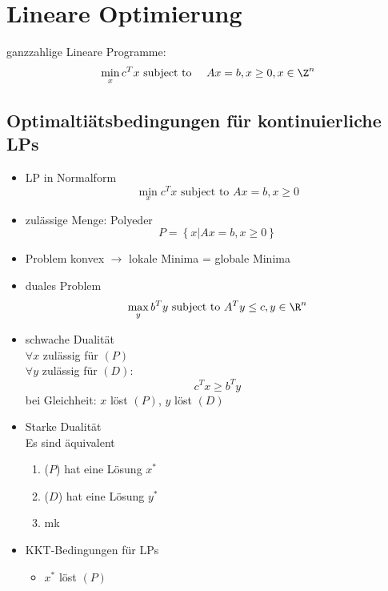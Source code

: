\section{Lineare Optimierung}
ganzzahlige Lineare Programme:
\begin{equation*}
	\min_{x} c^Tx \text{ subject to } \quad Ax = b, x \geq 0, x \in \Z^n
\end{equation*} 
\subsection{Optimaltiätsbedingungen für kontinuierliche LPs}
\begin{itemize}
	\item LP in Normalform 
		\begin{equation*}
			\min_{x} c^Tx \text{ subject to } Ax = b, x\geq 0
		\end{equation*} 
	\item zulässige Menge: Polyeder
		\begin{equation*}
			P = \left\{ x | Ax = b ,x \geq 0 \right\}
		\end{equation*} 
	\item Problem konvex $\to$	lokale Minima = globale Minima	
	\item duales Problem
		\begin{equation}\label{D}
			\max_{y}b^Ty \text{ subject to } A^Ty \leq c, y \in \R^n
		\end{equation} 
	\item schwache Dualität\\
		$\forall x$ zulässig für $(P)$\\%
		$\forall y$ zulässig für $(D)$:%
		\begin{equation*}
			c^Tx \geq b^Ty
		\end{equation*} 
		bei Gleichheit: $x$ löst $(P)$, $y$ löst $(D)$
	\item Starke Dualität\\
		Es sind äquivalent 
		\begin{enumerate}
			\item ($P$) hat eine Lösung $x^*$
			\item ($D$) hat eine Lösung $y^*$ 
			\item mk
		\end{enumerate} 
	\item KKT-Bedingungen für LPs
		\begin{itemize}
			\item $x^*$ löst $(P)$ 

\end{itemize}
\end{itemize}
